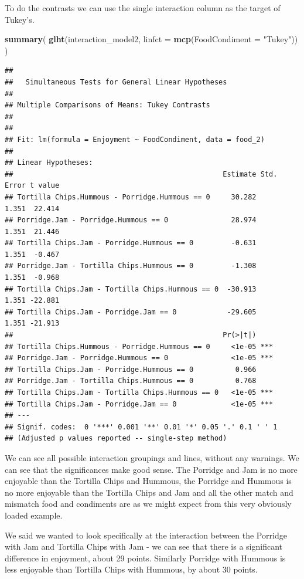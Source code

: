 \documentclass[
]{book}
\newenvironment{Shaded}{\begin{snugshade}}{\end{snugshade}}
\newcommand{\DataTypeTok}[1]{\textcolor[rgb]{0.13,0.29,0.53}{#1}}
\newcommand{\KeywordTok}[1]{\textcolor[rgb]{0.13,0.29,0.53}{\textbf{#1}}}
\newcommand{\NormalTok}[1]{#1}
\newcommand{\StringTok}[1]{\textcolor[rgb]{0.31,0.60,0.02}{#1}}
\begin{document}
To do the contrasts we can use the single interaction column as the target of Tukey's.

\begin{Shaded}
\begin{Highlighting}[]
\KeywordTok{summary}\NormalTok{(}
  \KeywordTok{glht}\NormalTok{(interaction_model2, }\DataTypeTok{linfct =} \KeywordTok{mcp}\NormalTok{(}\DataTypeTok{FoodCondiment =} \StringTok{"Tukey"}\NormalTok{))}
\NormalTok{  )}
\end{Highlighting}
\end{Shaded}

\begin{verbatim}
## 
## 	 Simultaneous Tests for General Linear Hypotheses
## 
## Multiple Comparisons of Means: Tukey Contrasts
## 
## 
## Fit: lm(formula = Enjoyment ~ FoodCondiment, data = food_2)
## 
## Linear Hypotheses:
##                                                  Estimate Std. Error t value
## Tortilla Chips.Hummous - Porridge.Hummous == 0     30.282      1.351  22.414
## Porridge.Jam - Porridge.Hummous == 0               28.974      1.351  21.446
## Tortilla Chips.Jam - Porridge.Hummous == 0         -0.631      1.351  -0.467
## Porridge.Jam - Tortilla Chips.Hummous == 0         -1.308      1.351  -0.968
## Tortilla Chips.Jam - Tortilla Chips.Hummous == 0  -30.913      1.351 -22.881
## Tortilla Chips.Jam - Porridge.Jam == 0            -29.605      1.351 -21.913
##                                                  Pr(>|t|)    
## Tortilla Chips.Hummous - Porridge.Hummous == 0     <1e-05 ***
## Porridge.Jam - Porridge.Hummous == 0               <1e-05 ***
## Tortilla Chips.Jam - Porridge.Hummous == 0          0.966    
## Porridge.Jam - Tortilla Chips.Hummous == 0          0.768    
## Tortilla Chips.Jam - Tortilla Chips.Hummous == 0   <1e-05 ***
## Tortilla Chips.Jam - Porridge.Jam == 0             <1e-05 ***
## ---
## Signif. codes:  0 '***' 0.001 '**' 0.01 '*' 0.05 '.' 0.1 ' ' 1
## (Adjusted p values reported -- single-step method)
\end{verbatim}

We can see all possible interaction groupings and lines, without any warnings. We can see that the significances make good sense. The Porridge and Jam is no more enjoyable than the Tortilla Chips and Hummous, the Porridge and Hummous is no more enjoyable than the Tortilla Chips and Jam and all the other match and mismatch food and condiments are as we might expect from this very obviously loaded example.

We said we wanted to look specifically at the interaction between the Porridge with Jam and Tortilla Chips with Jam - we can see that there is a significant difference in enjoyment, about 29 points. Similarly Porridge with Hummous is less enjoyable than Tortilla Chips with Hummous, by about 30 points.
\end{document}
